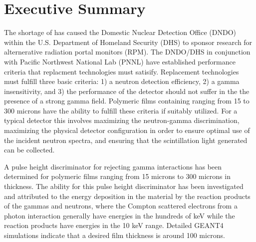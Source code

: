 \chapter{Executive Summary}
The shortage of  has caused the Domestic Nuclear Detection Office (DNDO) within the U.S. Department of Homeland Security (DHS) to sponsor research for alternerative radiation portal monitors (RPM).
The DNDO/DHS in conjunction with Pacific Northwest National Lab (PNNL) have established performance criteria that replacment technologies must satisify.
Replacement technologies must fulfill three basic criteria: 1) a neutron detection efficiency, 2) a gamma insensitivity, and 3) the performance of the detector should not suffer in the the presence of a strong gamma field.
Polymeric films containing  ranging from 15 to 300 microns have the ability to fulfill these criteria if suitably utilized.
For a typical detector this involves maximizing the neutron-gamma discrimination, maximizing the physical detector configuration in order to ensure optimal use of the incident neutron spectra, and ensuring that the scintillation light generated can be collected.

A pulse height discriminator for rejecting gamma interactions has been determined for polymeric films ranging from 15 microns to 300 microns in thickness. 
The ability for this pulse height discriminator has been investigated and attributed to the energy deposition in the material by the reaction products of the gammas and neutrons, where the Compton scattered electrons from a photon interaction generally have energies in the hundreds of keV while the  reaction products have energies in the 10 keV range. 
Detailed GEANT4 simulations indicate that a desired film thickness is around 100 microns. 

